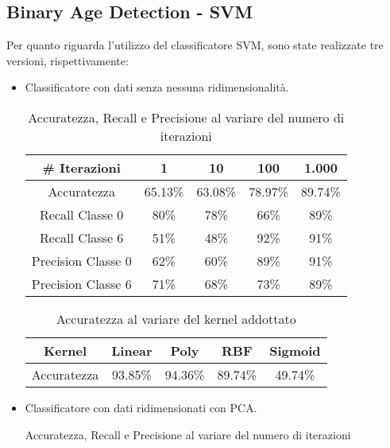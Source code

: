 \documentclass[12pt]{IEEEtran}
\begin{document}
\subsection{Binary Age Detection - SVM}
Per quanto riguarda l'utilizzo del classificatore SVM, sono state realizzate tre versioni, rispettivamente: 
\begin{itemize}
    \item Classificatore con dati senza nessuna ridimensionalità. 
    \begin{table}[h]
    \caption {Accuratezza, Recall e Precisione al variare del numero di iterazioni} \label{tab:title} 
       \begin{adjustbox}{width=\columnwidth}
        \begin{tabular}{|c|c|c|c|c|}
        \hline
        \# Iterazioni      & 1 & 10 & 100 & 1.000 \\ \hline
        Accuratezza        &65.13\% &63.08\% &78.97\%  &89.74\%       \\ \hline
        Recall Classe 0    &80\%    &78\%    &66\%     &89\%       \\ \hline
        Recall Classe 6    &51\%    &48\%    &92\%     &91\%       \\ \hline
        Precision Classe 0 &62\%    &60\%    &89\%     &91\%       \\ \hline
        Precision Classe 6 &71\%    &68\%    &73\%     &89\%       \\ \hline
        \end{tabular}
        \end{adjustbox}
        \end{table} \newpage
        \begin{table}[h!]
        \caption {Accuratezza al variare del kernel addottato}
        \begin{adjustbox}{width=\columnwidth}
        \begin{tabular}{|c|c|c|c|c|}
        \hline
        Kernel      & Linear  & Poly    & RBF     & Sigmoid \\ \hline
        Accuratezza & 93.85\% & 94.36\% & 89.74\% & 49.74\% \\ \hline
        \end{tabular}
        \end{adjustbox}
        \end{table}
        \item Classificatore con dati ridimensionati con PCA. 
        \begin{table}[h]
    \caption {Accuratezza, Recall e Precisione al variare del numero di iterazioni} \label{tab:title} 

\end{table}
\end{itemize}
\end{document}
